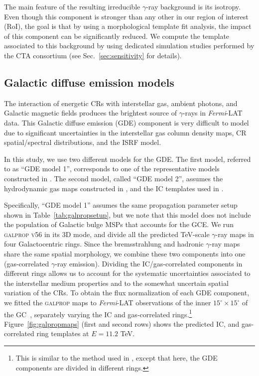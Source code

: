 \documentclass[doublespace,draft,nopageskip]{VTthesis} %
\begin{document}
The main feature of the resulting irreducible $\gamma$-ray background is its isotropy. Even though this component is stronger than any other in our region of interest (RoI), the goal is that by using a morphological template fit analysis, the impact of this component can be significantly reduced. We compute the template associated to this background by using dedicated simulation studies performed by the CTA consortium (see Sec.~\ref{sec:sensitivity} for details). 


\subsection{Galactic diffuse emission models}
\label{subsec:GDEmodels}

The interaction of energetic CRs with interstellar gas, ambient photons, and Galactic magnetic fields produces the brightest source of $\gamma$-rays in \textit{Fermi}-LAT data. This Galactic diffuse emission (GDE) component is very difficult to model due to significant uncertainties in the interstellar gas column density maps, CR spatial/spectral distributions, and the ISRF model.   

In this study, we use two different models for the GDE. The first model, referred to as ``GDE model 1'', corresponds to one of the representative models constructed in \cite{Johannesson:2018bit}. The second model, called ``GDE model 2'', assumes the hydrodynamic gas maps constructed in \cite{Macias:2016nev}, and the IC templates used in \cite{Abazajian:2020tww}.     

Specifically, ``GDE model 1'' assumes the same propagation parameter setup shown in Table~\ref{tab:galpropsetup}, but we note that this model does not include the population of Galactic bulge MSPs that accounts for the GCE. We run \textsc{galprop v56} in its 3D mode, and divide all the predicted TeV-scale $\gamma$-ray maps in four Galactocentric rings. Since the bremsstrahlung and hadronic $\gamma$-ray maps share the same spatial morphology, we combine these two components into one (gas-correlated $\gamma$-ray emission). Dividing the IC/gas-correlated components in different rings allows us to account for the systematic uncertainties associated to the interstellar medium properties and to the somewhat uncertain spatial variation of the CRs. 
To obtain the flux normalization of each GDE component, we fitted the \textsc{galprop} maps to \textit{Fermi}-LAT observations of the inner $15^\circ \times 15^\circ$ of the GC~\citep{Macias:2016nev}, separately varying the IC and gas-correlated rings.\footnote{This is similar to the method used in \cite{Rinchiuso:2020skh}, except that here, the GDE components are divided in different rings.} Figure~\ref{fig:galpropmaps} (first and second rows) shows the predicted IC, and gas-correlated ring templates at $E=11.2$ TeV. 
\end{document}
